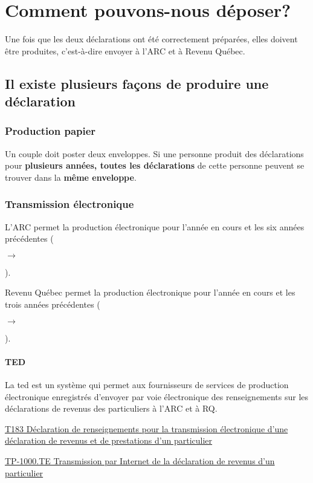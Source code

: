 \section{Comment pouvons-nous déposer?}
\begin{intro}
	Une fois que les deux déclarations ont été correctement préparées, elles doivent être produites, c'est-à-dire envoyer à l'ARC et à Revenu Québec.
\end{intro}


\subsection{Il existe plusieurs façons de produire une déclaration}
\subsubsection{Production papier}
Un couple doit poster deux enveloppes. Si une personne produit des déclarations pour \textbf{plusieurs années, toutes les déclarations} de cette personne peuvent se trouver dans la \textbf{même enveloppe}.

\subsubsection{Transmission électronique}
\setcounter{annee}{2023}
L'ARC permet la production électronique pour l'année en cours et les six années précédentes (\addtocounter{annee}{-6}\theannee{} $\rightarrow$ \addtocounter{annee}{6}\theannee{}).

\setcounter{annee}{2023}
Revenu Québec permet la production électronique pour l'année en cours et les trois années précédentes (\addtocounter{annee}{-3}\theannee{} $\rightarrow$ \addtocounter{annee}{3}\theannee{}).

\paragraph{TED}
La \acrshort{ted} est un système qui permet aux fournisseurs de services de production électronique enregistrés d'envoyer par voie électronique des renseignements sur les déclarations de revenus des particuliers à l'ARC et à RQ.

\cat\href{https://www.canada.ca/fr/agence-revenu/services/formulaires-publications/formulaires/t183.html}{T183 Déclaration de renseignements pour la transmission électronique d'une déclaration de revenus et de prestations d'un particulier}

\qct\href{https://www.revenuquebec.ca/fr/services-en-ligne/formulaires-et-publications/details-courant/tp-1000-te/}{TP-1000.TE Transmission par Internet de la déclaration de revenus d'un particulier}

